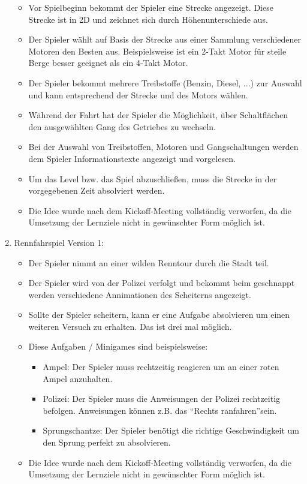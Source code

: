 \begin{enumerate}
		\begin{itemize}
			\item{Vor Spielbeginn bekommt der Spieler eine Strecke angezeigt. Diese Strecke ist in 2D und zeichnet sich durch Höhenunterschiede aus.}
			\item{Der Spieler wählt auf Basis der Strecke aus einer Sammlung verschiedener Motoren den Besten aus. Beispielsweise ist ein 2-Takt Motor für steile Berge besser geeignet als ein 4-Takt Motor.}
			\item{Der Spieler bekommt mehrere Treibstoffe (Benzin, Diesel, ...) zur Auswahl und kann entsprechend der Strecke und des Motors wählen.}
			\item{Während der Fahrt hat der Spieler die Möglichkeit, über Schaltflächen den ausgewählten Gang des Getriebes zu wechseln.}
			\item{Bei der Auswahl von Treibstoffen, Motoren und Gangschaltungen werden dem Spieler Informationstexte angezeigt und vorgelesen.}
			\item{Um das Level bzw. das Spiel abzuschließen, muss die Strecke in der vorgegebenen Zeit absolviert werden.}
			\item{Die Idee wurde nach dem Kickoff-Meeting vollständig verworfen, da die Umsetzung der Lernziele nicht in gewünschter Form möglich ist.}
		\end{itemize}
		\item{Rennfahrspiel Version 1:}
		\begin{itemize}
			\item{Der Spieler nimmt an einer wilden Renntour durch die Stadt teil.}
			\item{Der Spieler wird von der Polizei verfolgt und bekommt beim geschnappt werden verschiedene Annimationen des Scheiterns angezeigt.}
			\item{Sollte der Spieler scheitern, kann er eine Aufgabe absolvieren um einen weiteren Versuch zu erhalten. Das ist drei mal möglich.}
			\item{Diese Aufgaben / Minigames sind beispielsweise:}
			\begin{itemize}
				\item{Ampel: Der Spieler muss rechtzeitig reagieren um an einer roten Ampel anzuhalten.}
				\item{Polizei: Der Spieler muss die Anweisungen der Polizei rechtzeitig befolgen. Anweisungen können z.B. das \enquote{Rechts ranfahren}sein.}
				\item{Sprungschantze: Der Spieler benötigt die richtige Geschwindigkeit um den Sprung perfekt zu absolvieren.}
			\end{itemize}
			\item{Die Idee wurde nach dem Kickoff-Meeting vollständig verworfen, da die Umsetzung der Lernziele nicht in gewünschter Form möglich ist.}
		\end{itemize}
	\end{enumerate}
